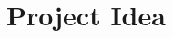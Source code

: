 \documentclass[12pt, oneside, a4paper]{book}
\begin{document}
\pagestyle{plain}

\frontmatter


\tableofcontents

\mainmatter
\chapter{Project Idea}






\backmatter
\end{document}
